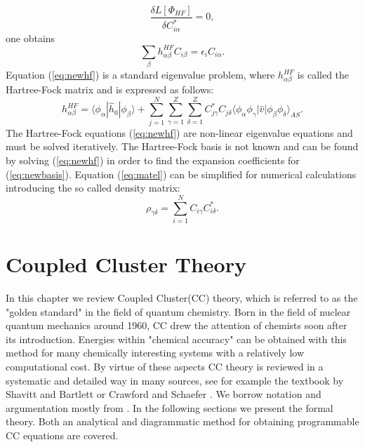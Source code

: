 \documentclass[twoside,english]{uiofysmaster}
\begin{document}
\begin{equation}
\frac {\delta L[\Phi_{HF}]}{\delta C^*_{i\alpha}} = 0,
\end{equation}
one obtains
\begin{equation}
\sum_{\beta}h_{\alpha\beta}^{HF}C_{i\beta}=\epsilon_iC_{i\alpha}. \label{eq:newhf}
\end{equation}
Equation (\ref{eq:newhf}) is a standard eigenvalue problem, where $h_{\alpha\beta}^{HF}$ is called the Hartree-Fock matrix and is expressed as follows:
\begin{equation}\label{eq:matel}
h_{\alpha\beta}^{HF}=\langle \phi_{\alpha} | \hat{h}_0 | \phi_{\beta} \rangle+
\sum_{j=1}^N\sum_{\gamma=1}^Z\sum_{\delta=1}^Z C^*_{j\gamma}C_{j\delta}\langle \phi_{\alpha}\phi_{\gamma}|\hat{v}|\phi_{\beta}\phi_{\delta}\rangle_{AS}.
\end{equation}
The Hartree-Fock equations (\ref{eq:newhf}) are non-linear eigenvalue equations and must be solved iteratively.
The Hartree-Fock basis is not known and can be found by solving (\ref{eq:newhf}) in order to find the expansion coefficients for (\ref{eq:newbasis}).
Equation (\ref{eq:matel}) can be simplified for numerical calculations introducing the so called density matrix:
\begin{equation}
\rho_{\gamma\delta} = \sum_{i=1}^{N}C_{i\gamma}C^*_{i\delta}.
\label{_auto10}
\end{equation}


\chapter{Coupled Cluster Theory}\label{CCchapter}


In this chapter we review Coupled Cluster(CC) theory, which is
referred to as the "golden standard" in the field of quantum
chemistry. Born in the field of nuclear quantum mechanics around 1960,
CC drew the attention of chemists soon after its introduction. Energies
within "chemical accuracy" can be obtained with this method for many
chemically interesting systems with a relatively low computational
cost. By virtue of these aspects CC theory is reviewed in a systematic
and detailed way in many sources, see for example the textbook by Shavitt and Bartlett
\cite{ShavittManybodymethodschemistry2009} or Crawford and Schaefer
\cite{CrawfordIntroductionCoupledCluster2007}.  We borrow notation and
argumentation mostly from
\cite{CrawfordIntroductionCoupledCluster2007}. In the following
sections we present the formal theory.  Both an analytical and
diagrammatic method for obtaining programmable CC equations are
covered.
\end{document}

